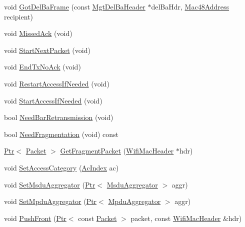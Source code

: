 \begin{DoxyCompactItemize}
\item 
void \hyperlink{classns3_1_1EdcaTxopN_af597de5434ff4a0a7cb18722ae945408}{Got\+Del\+Ba\+Frame} (const \hyperlink{classns3_1_1MgtDelBaHeader}{Mgt\+Del\+Ba\+Header} $\ast$del\+Ba\+Hdr, \hyperlink{classns3_1_1Mac48Address}{Mac48\+Address} recipient)
\item 
void \hyperlink{classns3_1_1EdcaTxopN_ad16ece50ac2937e5cdfeae010d4b5c88}{Missed\+Ack} (void)
\item 
void \hyperlink{classns3_1_1EdcaTxopN_a86df91f79cf79fbb677bd53fddafdae0}{Start\+Next\+Packet} (void)
\item 
void \hyperlink{classns3_1_1EdcaTxopN_a380e84736ede287cc8d26c1012828412}{End\+Tx\+No\+Ack} (void)
\item 
void \hyperlink{classns3_1_1EdcaTxopN_a83b65be22340dc3f27d08a453cf3831f}{Restart\+Access\+If\+Needed} (void)
\item 
void \hyperlink{classns3_1_1EdcaTxopN_a28a7052f217ed15058697197350d9801}{Start\+Access\+If\+Needed} (void)
\item 
bool \hyperlink{classns3_1_1EdcaTxopN_a704abf5e2a9cd43f9546f8a0181a0619}{Need\+Bar\+Retransmission} (void)
\item 
bool \hyperlink{classns3_1_1EdcaTxopN_a60daff47931c6501e47778c99c7e7a3c}{Need\+Fragmentation} (void) const 
\item 
\hyperlink{classns3_1_1Ptr}{Ptr}$<$ \hyperlink{classns3_1_1Packet}{Packet} $>$ \hyperlink{classns3_1_1EdcaTxopN_a512c6b82feb4d0caa1f79b98072bca91}{Get\+Fragment\+Packet} (\hyperlink{classns3_1_1WifiMacHeader}{Wifi\+Mac\+Header} $\ast$hdr)
\item 
void \hyperlink{classns3_1_1EdcaTxopN_ae7203b449d7865a1730fdc7006090b83}{Set\+Access\+Category} (\hyperlink{group__wifi_gab422b4562ba272b39a9b6bca3513f3ac}{Ac\+Index} ac)
\item 
void \hyperlink{classns3_1_1EdcaTxopN_a4430d3d755a2a08920c8df0a6e2a7ce6}{Set\+Msdu\+Aggregator} (\hyperlink{classns3_1_1Ptr}{Ptr}$<$ \hyperlink{classns3_1_1MsduAggregator}{Msdu\+Aggregator} $>$ aggr)
\item 
void \hyperlink{classns3_1_1EdcaTxopN_a7e7515c14b633de6c10087f02864b793}{Set\+Mpdu\+Aggregator} (\hyperlink{classns3_1_1Ptr}{Ptr}$<$ \hyperlink{classns3_1_1MpduAggregator}{Mpdu\+Aggregator} $>$ aggr)
\item 
void \hyperlink{classns3_1_1EdcaTxopN_a4ff1922de0b92b5f6a9104b714d82c0b}{Push\+Front} (\hyperlink{classns3_1_1Ptr}{Ptr}$<$ const \hyperlink{classns3_1_1Packet}{Packet} $>$ packet, const \hyperlink{classns3_1_1WifiMacHeader}{Wifi\+Mac\+Header} \&hdr)

\end{DoxyCompactItemize}
